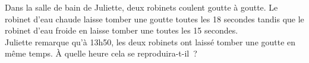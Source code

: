 %
%
Dans la salle de bain de Juliette, deux robinets coulent goutte à goutte. Le robinet d'eau chaude laisse tomber une goutte toutes les 18 secondes tandis que le robinet d'eau froide en laisse tomber une toutes les 15 secondes.\\
    Juliette remarque qu'à 13h50, les deux robinets ont laissé tomber une goutte en même temps. À quelle heure cela se reproduira-t-il~?
